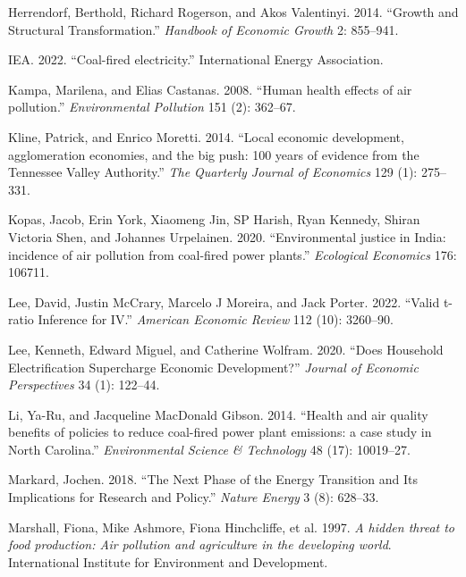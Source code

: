 \documentclass[
]{article}
\newlength{\cslhangindent}
\newlength{\cslentryspacingunit} %
\newenvironment{CSLReferences}[2] %
 {%
  \setlength{\parindent}{0pt}
  \ifodd #1
  \let\oldpar\par
  \def\par{\hangindent=\cslhangindent\oldpar}
  \fi
  \setlength{\parskip}{#2\cslentryspacingunit}
 }%
 {}
\begin{document}
\begin{CSLReferences}{1}{0}
\leavevmode{}%
Herrendorf, Berthold, Richard Rogerson, and Akos Valentinyi. 2014. {``Growth and Structural Transformation.''} \emph{{Handbook of Economic Growth}} 2: 855--941.

\leavevmode{}%
IEA. 2022. {``{Coal-fired electricity}.''} {International Energy Association}.

\leavevmode{}%
Kampa, Marilena, and Elias Castanas. 2008. {``{Human health effects of air pollution}.''} \emph{{Environmental Pollution}} 151 (2): 362--67.

\leavevmode{}%
Kline, Patrick, and Enrico Moretti. 2014. {``{Local economic development, agglomeration economies, and the big push: 100 years of evidence from the Tennessee Valley Authority}.''} \emph{The Quarterly Journal of Economics} 129 (1): 275--331.

\leavevmode{}%
Kopas, Jacob, Erin York, Xiaomeng Jin, SP Harish, Ryan Kennedy, Shiran Victoria Shen, and Johannes Urpelainen. 2020. {``{Environmental justice in India: incidence of air pollution from coal-fired power plants}.''} \emph{{Ecological Economics}} 176: 106711.

\leavevmode{}%
Lee, David, Justin McCrary, Marcelo J Moreira, and Jack Porter. 2022. {``{Valid t-ratio Inference for IV}.''} \emph{{American Economic Review}} 112 (10): 3260--90.

\leavevmode{}%
Lee, Kenneth, Edward Miguel, and Catherine Wolfram. 2020. {``Does Household Electrification Supercharge Economic Development?''} \emph{{Journal of Economic Perspectives}} 34 (1): 122--44.

\leavevmode{}%
Li, Ya-Ru, and Jacqueline MacDonald Gibson. 2014. {``{Health and air quality benefits of policies to reduce coal-fired power plant emissions: a case study in North Carolina}.''} \emph{{Environmental Science \& Technology}} 48 (17): 10019--27.

\leavevmode{}%
Markard, Jochen. 2018. {``The Next Phase of the Energy Transition and Its Implications for Research and Policy.''} \emph{{Nature Energy}} 3 (8): 628--33.

\leavevmode{}%
Marshall, Fiona, Mike Ashmore, Fiona Hinchcliffe, et al. 1997. \emph{{A hidden threat to food production: Air pollution and agriculture in the developing world}}. {International Institute for Environment and Development.}


\end{CSLReferences}
\end{document}
